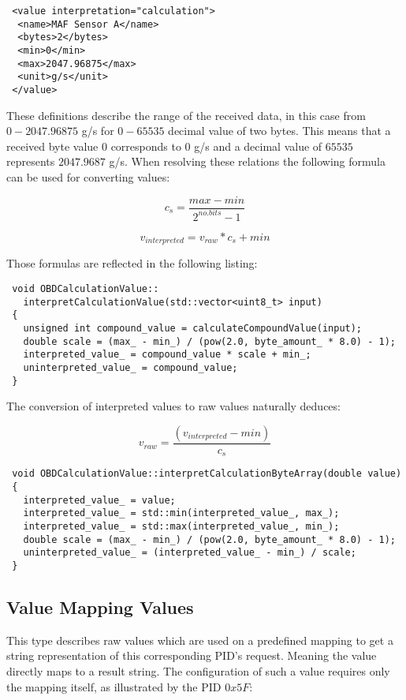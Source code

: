 \begin{verbatim}
 <value interpretation="calculation">
  <name>MAF Sensor A</name>
  <bytes>2</bytes>
  <min>0</min>
  <max>2047.96875</max>
  <unit>g/s</unit>
 </value>
\end{verbatim}

These definitions describe the range of the received data, in this case from $0-2047.96875$ g/s for $0-65535$ decimal value of two bytes. 
This means that a received byte value $0$ corresponds to $0$ g/s and a decimal value of $65535$ represents $2047.9687$ g/s. When resolving these 
relations the following formula can be used for converting values: 

\[ c_s = \frac{max - min}{2^{no. bits} - 1} \]

\[ v_{interpreted} = v_{raw} * c_s + min \]

Those formulas are reflected in the following listing:

\begin{verbatim}
 void OBDCalculationValue::
   interpretCalculationValue(std::vector<uint8_t> input)
 {
   unsigned int compound_value = calculateCompoundValue(input);
   double scale = (max_ - min_) / (pow(2.0, byte_amount_ * 8.0) - 1);
   interpreted_value_ = compound_value * scale + min_;
   uninterpreted_value_ = compound_value;
 }
\end{verbatim}

The conversion of interpreted values to raw values naturally deduces:

\[ v_{raw} = \frac{(v_{interpreted} - min)}{c_s} \]

\begin{verbatim}
 void OBDCalculationValue::interpretCalculationByteArray(double value)
 {
   interpreted_value_ = value;
   interpreted_value_ = std::min(interpreted_value_, max_);
   interpreted_value_ = std::max(interpreted_value_, min_);
   double scale = (max_ - min_) / (pow(2.0, byte_amount_ * 8.0) - 1);
   uninterpreted_value_ = (interpreted_value_ - min_) / scale;
 }
\end{verbatim}

\subsection{Value Mapping Values}

This type describes raw values which are used on a predefined mapping to get a string representation of this corresponding PID's request. Meaning the 
value directly maps to a result string. The configuration of such a value requires only the mapping itself, as illustrated by the PID $0x5F$:

